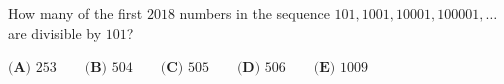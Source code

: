 How many of the first $2018$ numbers in the sequence $101,1001,10001,100001,\dots$ are divisible by $101$?

$\textbf{(A) }253\qquad\textbf{(B) }504\qquad\textbf{(C) }505\qquad\textbf{(D) }506\qquad\textbf{(E) }1009$

